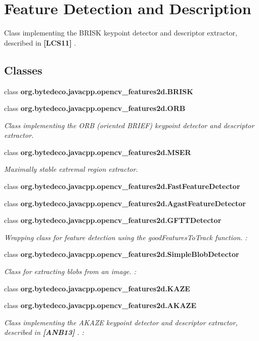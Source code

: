 \hypertarget{group__features2d__main}{}\section{Feature Detection and Description}
\label{group__features2d__main}


Class implementing the B\+R\+I\+SK keypoint detector and descriptor extractor, described in {\bfseries [L\+C\+S11]} .  


\subsection*{Classes}
\begin{DoxyCompactItemize}
\item 
class {\bfseries org.\+bytedeco.\+javacpp.\+opencv\+\_\+features2d.\+B\+R\+I\+SK}
\item 
class {\bfseries org.\+bytedeco.\+javacpp.\+opencv\+\_\+features2d.\+O\+RB}
\begin{DoxyCompactList}\small\item\em Class implementing the O\+RB ({\itshape oriented B\+R\+I\+EF}) keypoint detector and descriptor extractor. \end{DoxyCompactList}\item 
class {\bfseries org.\+bytedeco.\+javacpp.\+opencv\+\_\+features2d.\+M\+S\+ER}
\begin{DoxyCompactList}\small\item\em Maximally stable extremal region extractor. \end{DoxyCompactList}\item 
class {\bfseries org.\+bytedeco.\+javacpp.\+opencv\+\_\+features2d.\+Fast\+Feature\+Detector}
\item 
class {\bfseries org.\+bytedeco.\+javacpp.\+opencv\+\_\+features2d.\+Agast\+Feature\+Detector}
\item 
class {\bfseries org.\+bytedeco.\+javacpp.\+opencv\+\_\+features2d.\+G\+F\+T\+T\+Detector}
\begin{DoxyCompactList}\small\item\em Wrapping class for feature detection using the good\+Features\+To\+Track function. \+: \end{DoxyCompactList}\item 
class {\bfseries org.\+bytedeco.\+javacpp.\+opencv\+\_\+features2d.\+Simple\+Blob\+Detector}
\begin{DoxyCompactList}\small\item\em Class for extracting blobs from an image. \+: \end{DoxyCompactList}\item 
class {\bfseries org.\+bytedeco.\+javacpp.\+opencv\+\_\+features2d.\+K\+A\+ZE}
\item 
class {\bfseries org.\+bytedeco.\+javacpp.\+opencv\+\_\+features2d.\+A\+K\+A\+ZE}
\begin{DoxyCompactList}\small\item\em Class implementing the A\+K\+A\+ZE keypoint detector and descriptor extractor, described in {\bfseries [A\+N\+B13]} . \+: \end{DoxyCompactList}\end{DoxyCompactItemize}
